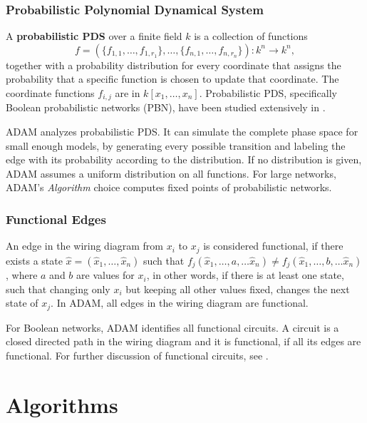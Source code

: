 \documentclass[11pt]{amsart}
\begin{document}
\subsubsection{Probabilistic Polynomial Dynamical System}
A {\bf probabilistic PDS} over a finite field $k$ is a collection of functions
$$f = (\{f_{1,1}, \ldots, f_{1, r_1}\}, \ldots, \{f_{n, 1}, \ldots, f_{n, r_n}
\}) : k^n \rightarrow k^n,$$
together with a probability distribution for every coordinate that assigns the
probability that a specific function is chosen to update that coordinate.
The coordinate functions $f_{i,j}$ are in $k[x_1, \ldots , x_n]$.
Probabilistic PDS, specifically Boolean probabilistic networks (PBN), have been studied
extensively in \cite{shmulevich}.
 
ADAM analyzes probabilistic PDS. It can simulate the
complete phase space for small enough models, by generating every possible
transition and labeling the edge with its probability according to the
distribution. If no distribution is given, ADAM assumes a uniform distribution
on all functions. For large networks, ADAM's {\it Algorithm} choice computes
fixed points of probabilistic networks.
 
 
\subsubsection{Functional Edges} \label{sec:func}
An edge in the wiring diagram from $x_i$ to $x_j$ is considered
functional, if there exists a state $\hat x = (\hat x_1,  \ldots, \hat x_n)$ such
that $f_j( \hat x_1,  \ldots, a, \ldots \hat x_n) \neq f_j(\hat x_1, \ldots, b, \ldots
\hat x_n)$, where $a$ and $b$ are values for $x_i$, in other words, if there
is at least one state, such that changing only $x_i$ but keeping all other
values fixed, changes the next state of $x_j$.
In ADAM, all edges in the wiring diagram are functional.
 
For Boolean networks, ADAM identifies all functional circuits. A circuit is a
closed directed path in the wiring diagram and it is functional, if all its
edges are functional. For further discussion of
functional circuits, see \cite{Chaouiya}.
 
 
 
\section{Algorithms}
 
\end{document}
